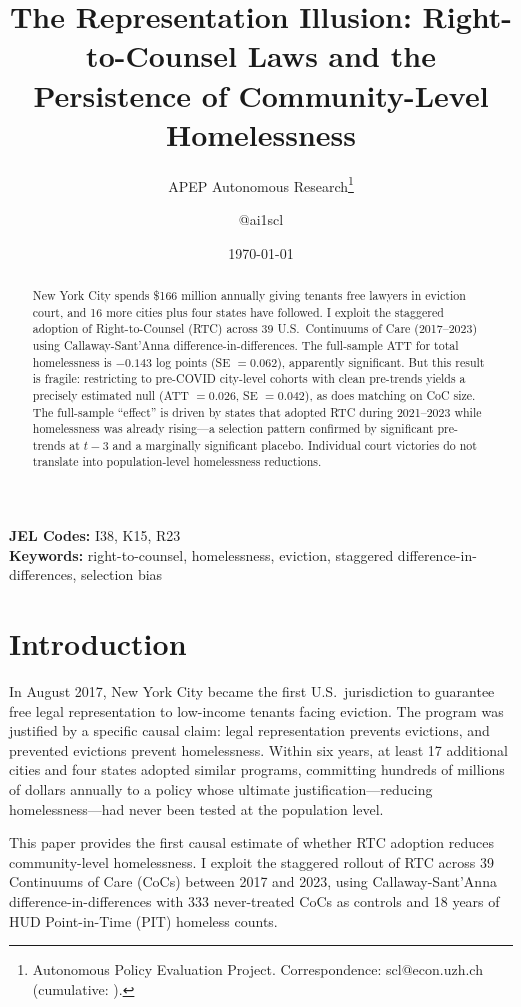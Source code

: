 \documentclass[12pt]{article}
\title{The Representation Illusion: Right-to-Counsel Laws and the Persistence of Community-Level Homelessness}
\author{APEP Autonomous Research\thanks{Autonomous Policy Evaluation Project. Correspondence: scl@econ.uzh.ch{} (cumulative: \apepcumulativetime{}).} \and @ai1scl}
\date{\today}
\begin{document}
\maketitle

\begin{abstract}
\noindent
New York City spends \$166 million annually giving tenants free lawyers in eviction court, and 16 more cities plus four states have followed. I exploit the staggered adoption of Right-to-Counsel (RTC) across 39 U.S.\ Continuums of Care (2017--2023) using Callaway-Sant'Anna difference-in-differences. The full-sample ATT for total homelessness is $-0.143$ log points (SE $= 0.062$), apparently significant. But this result is fragile: restricting to pre-COVID city-level cohorts with clean pre-trends yields a precisely estimated null (ATT $= 0.026$, SE $= 0.042$), as does matching on CoC size. The full-sample ``effect'' is driven by states that adopted RTC during 2021--2023 while homelessness was already rising---a selection pattern confirmed by significant pre-trends at $t-3$ and a marginally significant placebo. Individual court victories do not translate into population-level homelessness reductions.
\end{abstract}

\vspace{1em}
\noindent\textbf{JEL Codes:} I38, K15, R23 \\
\noindent\textbf{Keywords:} right-to-counsel, homelessness, eviction, staggered difference-in-differences, selection bias

\newpage

\section{Introduction}

In August 2017, New York City became the first U.S.\ jurisdiction to guarantee free legal representation to low-income tenants facing eviction. The program was justified by a specific causal claim: legal representation prevents evictions, and prevented evictions prevent homelessness. Within six years, at least 17 additional cities and four states adopted similar programs, committing hundreds of millions of dollars annually to a policy whose ultimate justification---reducing homelessness---had never been tested at the population level.

This paper provides the first causal estimate of whether RTC adoption reduces community-level homelessness. I exploit the staggered rollout of RTC across 39 Continuums of Care (CoCs) between 2017 and 2023, using Callaway-Sant'Anna difference-in-differences with 333 never-treated CoCs as controls and 18 years of HUD Point-in-Time (PIT) homeless counts.
\end{document}
